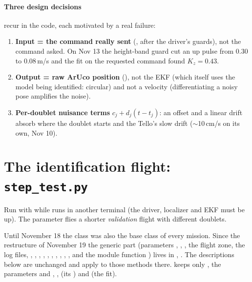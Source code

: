\paragraph{Three design decisions} recur in the code, each motivated by a real failure:
\begin{enumerate}[nosep]
\item \textbf{Input = the command really sent} (, after the driver's guards), not the
command asked. On Nov 13 the height-band guard cut an up pulse from 0.30 to 0.08\,m/s and the fit on the
requested command found $K_z = 0.43$.
\item \textbf{Output = raw ArUco position} (), not the EKF (which itself uses the model
being identified: circular) and not a velocity (differentiating a noisy pose amplifies the noise).
\item \textbf{Per-doublet nuisance terms} $c_j + d_j(t-t_j)$: an offset and a linear drift absorb where the
doublet starts and the Tello's slow drift ($\sim$10\,cm/s on its own, Nov 10).
\end{enumerate}

\section{The identification flight: \texorpdfstring{\texttt{step\_test.py}}{step\_test.py}}\label{sec:steptest}

Run with  while  runs in another terminal
(the driver, localizer and EKF must be up). The parameter  flies a shorter
\emph{validation} flight with different doublets.

\begin{keypoint}
Until November 18 the class  was also the base class of every mission. Since the restructure of
November 19 the generic part (parameters , , , the flight zone, the
log files, , , , , , ,
, , , ,  and the module function
) lives in , . The descriptions below are unchanged and apply
to those methods there.  keeps only , the parameters  and
, ,  (its ) and  (the fit).
\end{keypoint}

